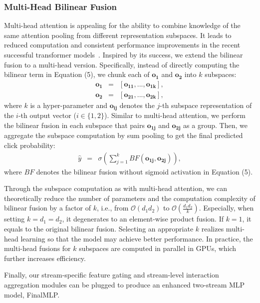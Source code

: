 \documentclass[letterpaper]{article} \usepackage{aaai23}  \usepackage{times}  \usepackage{helvet}  \usepackage{courier}  \usepackage[hyphens]{url}  \usepackage{graphicx} \urlstyle{rm} \def\UrlFont{\rm}  \usepackage{natbib}  \usepackage{caption} \frenchspacing  \setlength{\pdfpagewidth}{8.5in}  \setlength{\pdfpageheight}{11in}  \usepackage{algorithm}
\begin{document}
\subsubsection{Multi-Head Bilinear Fusion} 
Multi-head attention is appealing for the ability to combine knowledge of the same attention pooling from different representation subspaces. It leads to reduced computation and consistent performance improvements in the recent successful transformer models~\cite{Transformer}. Inspired by its success, we extend the bilinear fusion to a multi-head version. Specifically, instead of directly computing the bilinear term in Equation (5), we chunk each of $\mathbf{o_1}$ and $\mathbf{o_2}$ into $k$ subspaces:
\begin{eqnarray}
\mathbf{o_1} &=& [\mathbf{o_{11}}, ..., \mathbf{o_{1k}} ], \\
\mathbf{o_2} &=& [\mathbf{o_{21}}, ..., \mathbf{o_{2k}} ],
\end{eqnarray}
where $k$ is a hyper-parameter and $\mathbf{o_{ij}}$ denotes the $j$-th subspace representation of the $i$-th output vector ($i \in \{1, 2\}$). Similar to multi-head attention, we perform the bilinear fusion in each subspace that pairs $\mathbf{o_{1j}}$ and $\mathbf{o_{2j}}$ as a group. Then, we aggregate the subspace computation by sum pooling to get the final predicted click probability:
\begin{eqnarray}
\hat{y} &=& \sigma(\sum_{j=1}^{k}{BF}(\mathbf{o_{1j}}, \mathbf{o_{2j}})),
\end{eqnarray}
where ${BF}$ denotes the bilinear fusion without sigmoid activation in Equation (5).





Through the subspace computation as with multi-head attention, we can theoretically reduce the number of parameters and the computation complexity of bilinear fusion by a factor of $k$, i.e., from $\mathcal{O}(d_1d_2)$ to $\mathcal{O}(\frac{d_1d_2}{k})$. Especially, when setting $k=d_1=d_2$, it degenerates to an element-wise product fusion.
If $k=1$, it equals to the original bilinear fusion. Selecting an appropriate $k$ realizes multi-head learning so that the model may achieve better performance. In practice, the multi-head fusions for $k$ subspaces are computed in parallel in GPUs, which further increases efficiency.



Finally, our stream-specific feature gating and stream-level interaction aggregation modules can be plugged to produce an enhanced two-stream MLP model, FinalMLP.
\end{document}
